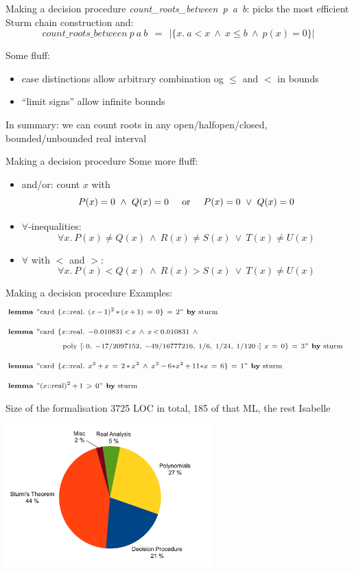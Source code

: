 \documentclass[%
	sans,			%
	mathsans,		%
	10pt,
	t		%
	slidescentered,%
]{beamer}
\newcommand{\lem}{\textbf{lemma}}
\newcommand{\card}{\textrm{card}}
\newcommand{\real}{\textrm{real}}
\begin{document}
\begin{frame}{Making a decision procedure}
\textit{count\_roots\_between\ p\ a\ b}: picks the most efficient Sturm chain construction and:
$$\textit{count\_roots\_between}\ p\ a\ b\ \ =\ \ |\{x.\ a < x\ \wedge\ x \leq b\ \wedge\ p(x) = 0\}|$$\vskip2mm
\pause

Some fluff:
\begin{itemize}
\item case distinctions allow arbitrary combination og $\leq$ and $<$ in bounds
\item \enquote{limit signs} allow infinite bounds
\end{itemize}
In summary: we can count roots in any open/halfopen/closed, bounded/unbounded real interval
\end{frame}

\begin{frame}{Making a decision procedure}
Some more fluff:
\begin{itemize}
\item and/or: count $x$ with $$P(x)=0\ \wedge\ Q(x)=0\hskip5mm\mathrm{or}\hskip5mm P(x)=0\ \vee\ Q(x)=0$$\pause
\item $\forall$-inequalities: $$\forall x.\ P(x) \neq Q(x)\ \wedge\ R(x) \neq S(x)\ \vee\ T(x)\neq U(x)$$\pause
\item $\forall$ with $<$ and $>$: $$\forall x.\ P(x) < Q(x)\ \wedge\ R(x) > S(x)\ \vee\ T(x)\neq U(x)$$
\end{itemize}
\end{frame}

\begin{frame}{\hskip-2mm Making a decision procedure}
\hskip-2mm Examples:
\begin{align*}
&\hskip-2mm\scriptstyle
\lem\ "\card\ \{x::\real.\ (x\, -\, 1)^2\, *\, (x\, +\, 1)\ =\ 0\}\ =\ 2"\ \textrm{\textbf{by}\ sturm}\\[2mm]
&\hskip-2mm\scriptstyle\textbf{lemma}\ "\mathrm{card}\ \{x::\mathrm{real}.\ -0.010831\, <\, x\ \wedge\ x\, <\, 0.010831\ \wedge\\
&\hskip-2mm\scriptstyle\hskip20mm \mathrm{poly}\ [:\,0,\  -17/2097152,\  -49/16777216,\  1/6,\  1/24,\  1/120\,:]\ x\ =\ 0\}\  =\  3"\ \textrm{\textbf{by}\ sturm}\\[2mm]
&\hskip-2mm\scriptstyle\lem\ "\card\ \{x::\real.\ x^3\, +\, x\ =\ 2\,*\,x^2\ \wedge\ x^3\,-\,6*x^2\,+\,11*x\ =\ 6\}\  =\  1"\ \textrm{\textbf{by}\ sturm}\\[2mm]
&\hskip-2mm\scriptstyle\lem\ "(x::\real)^2\,+\,1\ >\ 0"\ \textrm{\textbf{by}\ sturm}
\end{align*}
\end{frame}

\begin{frame}{Size of the formalisation}
3725 LOC in total, 185 of that ML, the rest Isabelle
\begin{center}
\includegraphics[width=8cm]{plot.pdf}
\end{center}
\end{frame}
\end{document}

